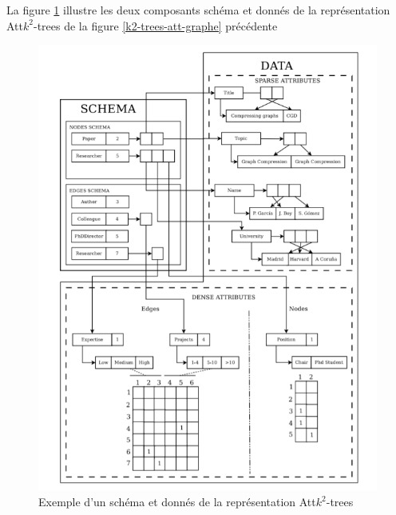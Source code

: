 \begin{itemize}
\begin{description}
\end{description}
La figure \ref{k2-trees-att-schema} illustre les deux composants schéma et donnés de la représentation Att$k^2$-trees  de la figure \ref{k2-trees-att-graphe} précédente
\begin{figure}[H]
\begin{center}
\includegraphics[height=200 pt, width=280 pt]{./ressources/image/k2-trees-att-schema.png} 
\end{center}
\caption{Exemple d'un schéma et donnés de la représentation Att$k^2$-trees}
\label{k2-trees-att-schema}
\end{figure}



\end{itemize}
